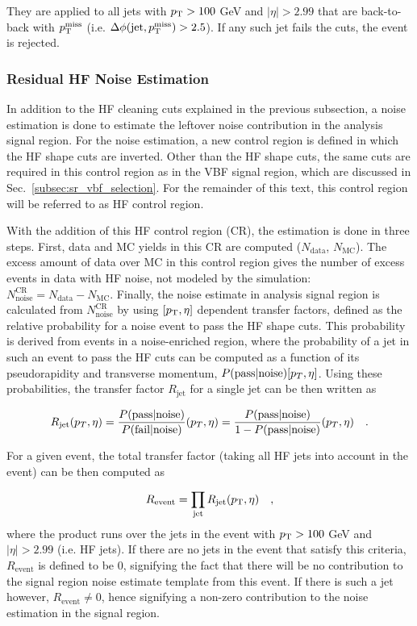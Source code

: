 They are applied to all jets with $p_{\textrm{T}} > 100$ GeV and $|\eta| > 2.99$ that are back-to-back with $p_{\textrm{T}}^{\textrm{miss}}$
(i.e. $\Delta\phi(\textrm{jet},p_{\textrm{T}}^{\textrm{miss}}) > 2.5$). If any such jet fails the cuts, the event is rejected. 


\subsubsection{Residual HF Noise Estimation}
\label{subsubsec:hf_noise_est}

In addition to the HF cleaning cuts explained in the previous subsection,
a noise estimation is done to estimate the leftover noise contribution in  
the analysis signal region. For the noise estimation, a new control region is defined
in which the HF shape cuts are inverted. Other than the HF shape cuts,
the same cuts are required in this control region as in the VBF signal region, which are
discussed in Sec.~\ref{subsec:sr_vbf_selection}. For the remainder of this text, this control
region will be referred to as HF control region.

With the addition of this HF control region (CR), the estimation is done in three steps.
First, data and MC yields in this CR are computed ($N_{\textrm{data}}$, $N_{\textrm{MC}}$). The excess amount of data over MC 
in this control region gives the number of excess events in data with HF noise, not modeled by the 
simulation: $N_{\textrm{noise}}^{\textrm{CR}} = N_{\textrm{data}} - N_{\textrm{MC}}$. 
Finally, the noise estimate in analysis signal region is calculated from $N_{\textrm{noise}}^{\textrm{CR}}$ by using $[p_{\textrm{T}}, \eta]$ dependent transfer factors,
defined as the relative probability for a noise event to pass the HF shape cuts.
This probability is derived from events in a noise-enriched region, where the probability of a jet in such an event
to pass the HF cuts can be computed as a function of its pseudorapidity and transverse momentum, $P( \text{pass} | \text{noise} )[p_{T}, \eta]$.
Using these probabilities, the transfer factor $R_{\textrm{jet}}$ for a single jet can be then written as

\begin{equation}
    R_{\textrm{jet}} (p_T, \eta) = \frac{P( \text{pass} | \text{noise} )}{P( \text{fail} | \text{noise} )} (p_T, \eta) = \frac{P( \text{pass} | \text{noise} )}{1 - P( \text{pass} | \text{noise} )} (p_T, \eta) \quad .
\end{equation}

For a given event, the total transfer factor (taking all HF jets into account in the event) can be then computed as

\begin{equation}
    R_{\textrm{event}} = \prod_{\textrm{jet}} R_{\textrm{jet}} (p_{\textrm{T}}, \eta) \quad ,
\end{equation}
where the product runs over the jets in the event with $p_{\textrm{T}} > 100$ GeV and $|\eta| > 2.99$ (i.e. HF jets). If there are no
jets in the event that satisfy this criteria, $R_{\textrm{event}}$ is defined to be $0$, signifying the fact that there will be no contribution
to the signal region noise estimate template from this event. If there is such a jet however, $R_{\textrm{event}} \neq 0$, hence signifying
a non-zero contribution to the noise estimation in the signal region.

